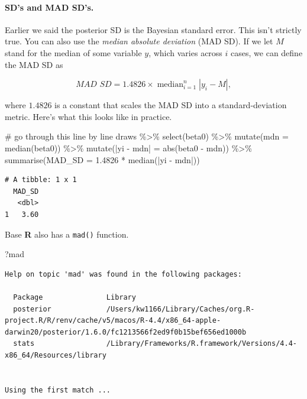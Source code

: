 \documentclass[
  letterpaper,
  DIV=11,
  numbers=noendperiod]{scrartcl}
\let\oldparagraph\paragraph
\renewcommand{\paragraph}[1]{\oldparagraph{#1}\mbox{}}
\newenvironment{Shaded}{\begin{snugshade}}{\end{snugshade}}
\newcommand{\AttributeTok}[1]{\textcolor[rgb]{0.40,0.45,0.13}{#1}}
\newcommand{\CommentTok}[1]{\textcolor[rgb]{0.37,0.37,0.37}{#1}}
\newcommand{\FloatTok}[1]{\textcolor[rgb]{0.68,0.00,0.00}{#1}}
\newcommand{\FunctionTok}[1]{\textcolor[rgb]{0.28,0.35,0.67}{#1}}
\newcommand{\NormalTok}[1]{\textcolor[rgb]{0.00,0.23,0.31}{#1}}
\newcommand{\OtherTok}[1]{\textcolor[rgb]{0.00,0.23,0.31}{#1}}
\newcommand{\SpecialCharTok}[1]{\textcolor[rgb]{0.37,0.37,0.37}{#1}}
\newcommand{\StringTok}[1]{\textcolor[rgb]{0.13,0.47,0.30}{#1}}
\begin{document}
\paragraph{SD's and MAD SD's.}\label{sds-and-mad-sds.}

Earlier we said the posterior SD is the Bayesian standard error. This
isn't strictly true. You can also use the \emph{median absolute
deviation} (MAD SD). If we let \(M\) stand for the median of some
variable \(y\), which varies across \(i\) cases, we can define the MAD
SD as

\[\textit{MAD SD} = 1.4826 \times \operatorname{median}_{i = 1}^n |y_i - M|,\]

where \(1.4826\) is a constant that scales the MAD SD into a
standard-deviation metric. Here's what this looks like in practice.

\begin{Shaded}
\begin{Highlighting}[]
\CommentTok{\# go through this line by line}
\NormalTok{draws }\SpecialCharTok{\%\textgreater{}\%} 
  \FunctionTok{select}\NormalTok{(beta0) }\SpecialCharTok{\%\textgreater{}\%} 
  \FunctionTok{mutate}\NormalTok{(}\AttributeTok{mdn =} \FunctionTok{median}\NormalTok{(beta0)) }\SpecialCharTok{\%\textgreater{}\%} 
  \FunctionTok{mutate}\NormalTok{(}\StringTok{\textasciigrave{}}\AttributeTok{|yi {-} mdn|}\StringTok{\textasciigrave{}} \OtherTok{=} \FunctionTok{abs}\NormalTok{(beta0 }\SpecialCharTok{{-}}\NormalTok{ mdn)) }\SpecialCharTok{\%\textgreater{}\%} 
  \FunctionTok{summarise}\NormalTok{(}\AttributeTok{MAD\_SD =} \FloatTok{1.4826} \SpecialCharTok{*} \FunctionTok{median}\NormalTok{(}\StringTok{\textasciigrave{}}\AttributeTok{|yi {-} mdn|}\StringTok{\textasciigrave{}}\NormalTok{))}
\end{Highlighting}
\end{Shaded}

\begin{verbatim}
# A tibble: 1 x 1
  MAD_SD
   <dbl>
1   3.60
\end{verbatim}

Base \textbf{R} also has a \texttt{mad()} function.

\begin{Shaded}
\begin{Highlighting}[]
\NormalTok{?mad}
\end{Highlighting}
\end{Shaded}

\begin{verbatim}
Help on topic 'mad' was found in the following packages:

  Package               Library
  posterior             /Users/kw1166/Library/Caches/org.R-project.R/R/renv/cache/v5/macos/R-4.4/x86_64-apple-darwin20/posterior/1.6.0/fc1213566f2ed9f0b15bef656ed1000b
  stats                 /Library/Frameworks/R.framework/Versions/4.4-x86_64/Resources/library


Using the first match ...
\end{verbatim}
\end{document}
